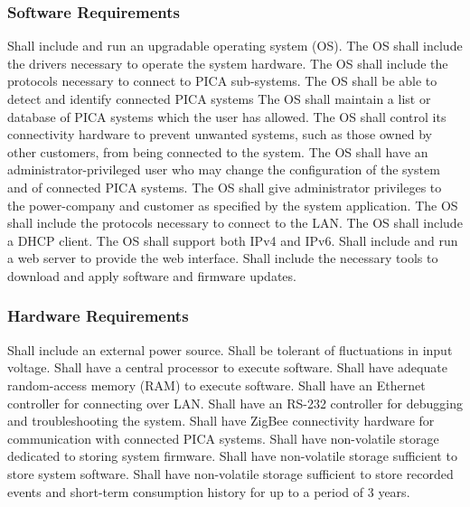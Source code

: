 \subsubsection{Software Requirements}
\begin{outline}[enumerate]
\1 Shall include and run an upgradable operating system (OS).
\2 The OS shall include the drivers necessary to operate the system hardware.
\2 The OS shall include the protocols necessary to connect to PICA sub-systems.
\2 The OS shall be able to detect and identify connected PICA systems
\1 The OS shall maintain a list or database of PICA systems which the user has allowed.
\1 The OS shall control its connectivity hardware to prevent unwanted systems, such as those owned by other customers, from being connected to the system.
\1 The OS shall have an administrator-privileged user who may change the configuration of the system and of connected PICA systems.
\1 The OS shall give administrator privileges to the power-company and customer as specified by the system application.
\1 The OS shall include the protocols necessary to connect to the LAN.
\2 The OS shall include a DHCP client.
\2 The OS shall support both IPv4 and IPv6.
\1 Shall include and run a web server to provide the web interface.
\1 Shall include the necessary tools to download and apply software and firmware updates.
\end{outline}

\subsubsection{Hardware Requirements}
\begin{outline}[enumerate]
\1 Shall include an external power source.
\1 Shall be tolerant of fluctuations in input voltage.
\1 Shall have a central processor to execute software.
\1 Shall have adequate random-access memory (RAM) to execute software.
\1 Shall have an Ethernet controller for connecting over LAN.
\1 Shall have an RS-232 controller for debugging and troubleshooting the system.
\1 Shall have ZigBee connectivity hardware for communication with connected PICA systems.
\1 Shall have non-volatile storage dedicated to storing system firmware.
\1 Shall have non-volatile storage sufficient to store system software.
\1 Shall have non-volatile storage sufficient to store recorded events and short-term consumption history for up to a period of 3 years.
\end{outline}

